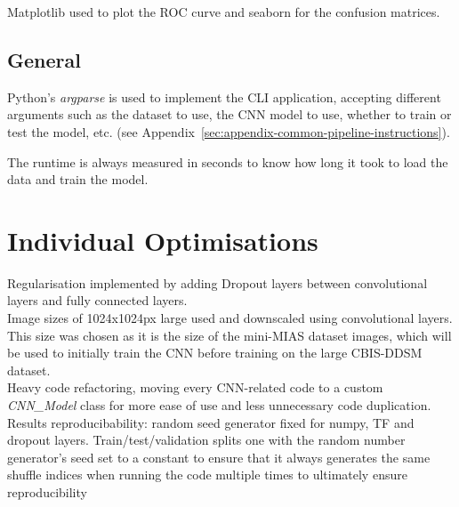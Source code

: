Matplotlib used to plot the ROC curve and seaborn for the confusion matrices.


\subsection{General}

Python's \textit{argparse} is used to implement the CLI application, accepting different arguments such as the dataset to use, the CNN model to use, whether to train or test the model, etc. (see Appendix~\ref{sec:appendix-common-pipeline-instructions}).

The runtime is always measured in seconds to know how long it took to load the data and train the model.


\section{Individual Optimisations}

Regularisation implemented by adding Dropout layers between convolutional layers and fully connected layers.\\

Image sizes of 1024x1024px large used and downscaled using convolutional layers. This size was chosen as it is the size of the mini-MIAS dataset images, which will be used to initially train the CNN before training on the large CBIS-DDSM dataset.\\

Heavy code refactoring, moving every CNN-related code to a custom \textit{CNN\_Model} class for more ease of use and less unnecessary code duplication.\\

Results reproducibability:
random seed generator fixed for numpy, TF and dropout layers. Train/test/validation splits one with the random number generator’s seed set to a constant to ensure that it always generates the same shuffle indices when running the code multiple times to ultimately ensure reproducibility




